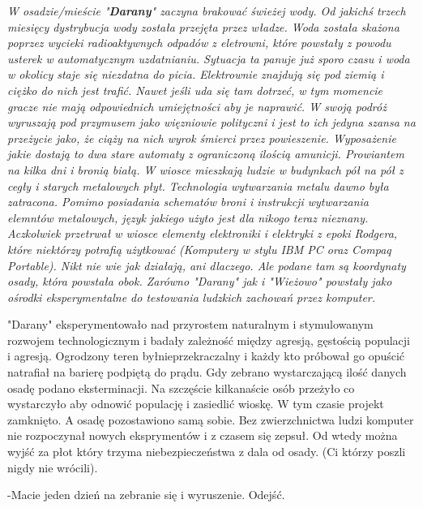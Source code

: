 \documentclass{article}
\begin{document}
    \slshape
    W osadzie/mieście "\textbf{Darany}" zaczyna brakować świeżej wody. Od jakichś trzech miesięcy dystrybucja wody została przejęta przez władze. Woda została skażona poprzez wycieki radioaktywnych odpadów z eletrowni, które powstały z powodu usterek w automatycznym uzdatnianiu. Sytuacja ta panuje już sporo czasu i woda w okolicy staje się niezdatna do picia. Elektrownie znajdują się pod ziemią i ciężko do nich jest trafić. Nawet jeśli uda się tam dotrzeć, w tym momencie gracze nie mają odpowiednich umiejętności aby je naprawić.
    W swoją podróż wyruszają pod przymusem jako więzniowie polityczni i jest to ich jedyna szansa na przeżycie jako, że ciąży na nich wyrok śmierci przez powieszenie. Wyposażenie jakie dostają to dwa stare automaty z ograniczoną ilością amunicji. Prowiantem na kilka dni i bronią białą. W wiosce mieszkają ludzie w budynkach pół na pół z cegły i starych metalowych płyt. Technologia wytwarzania metalu dawno była zatracona. Pomimo posiadania schematów broni i instrukcji wytwarzania elemntów metalowych, język jakiego użyto jest dla nikogo teraz nieznany. Aczkolwiek przetrwał w wiosce elementy elektroniki i elektryki z epoki Rodgera, które niektórzy potrafią użytkować (Komputery w stylu IBM PC oraz Compaq Portable). Nikt nie wie jak działają, ani dlaczego. Ale podane tam są koordynaty osady, która powstała obok. Zarówno "Darany" jak i "Wieżowo" powstały jako ośrodki eksperymentalne do testowania ludzkich zachowań przez komputer.

    "Darany" eksperymentowało nad przyrostem naturalnym i stymulowanym rozwojem technologicznym i badały zależność między agresją, gęstością populacji i agresją. Ogrodzony teren byłnieprzekraczalny i każdy kto próbował go opuścić natrafiał na barierę podpiętą do prądu. Gdy zebrano wystarczającą ilość danych osadę podano eksterminacji. Na szczęście kilkanaście osób przeżyło co wystarczyło aby odnowić populację i zasiedlić wioskę. W tym czasie projekt zamknięto. A osadę pozostawiono samą sobie. Bez zwierzchnictwa ludzi komputer nie rozpoczynał nowych eksprymentów i z czasem się zepsuł. Od wtedy można wyjść za płot który trzyma niebezpieczeństwa z dala od osady. (Ci którzy poszli nigdy nie wrócili). \bigskip

    \normalfont
    -Macie jeden dzień na zebranie się i wyruszenie. Odejść.
\end{document}
